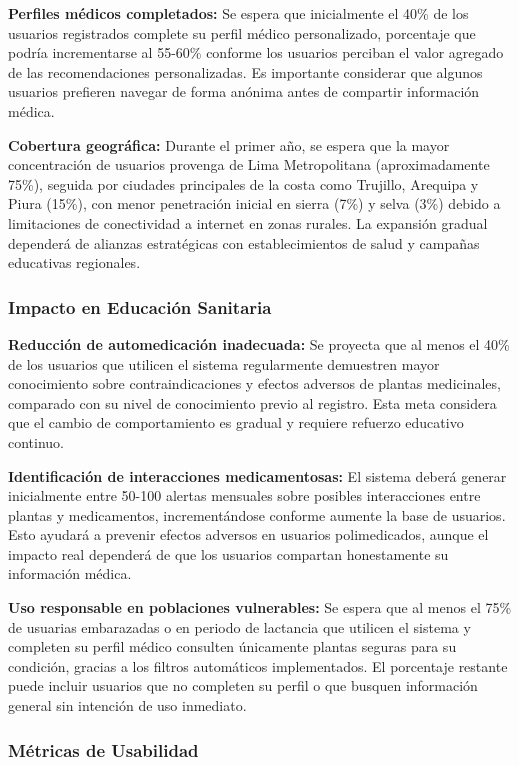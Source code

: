 \documentclass[12pt,a4paper]{article}
\begin{document}
\textbf{Perfiles médicos completados:} Se espera que inicialmente el 40\% de los usuarios registrados complete su perfil médico personalizado, porcentaje que podría incrementarse al 55-60\% conforme los usuarios perciban el valor agregado de las recomendaciones personalizadas. Es importante considerar que algunos usuarios prefieren navegar de forma anónima antes de compartir información médica.

\textbf{Cobertura geográfica:} Durante el primer año, se espera que la mayor concentración de usuarios provenga de Lima Metropolitana (aproximadamente 75\%), seguida por ciudades principales de la costa como Trujillo, Arequipa y Piura (15\%), con menor penetración inicial en sierra (7\%) y selva (3\%) debido a limitaciones de conectividad a internet en zonas rurales. La expansión gradual dependerá de alianzas estratégicas con establecimientos de salud y campañas educativas regionales.

\subsubsection{Impacto en Educación Sanitaria}

\textbf{Reducción de automedicación inadecuada:} Se proyecta que al menos el 40\% de los usuarios que utilicen el sistema regularmente demuestren mayor conocimiento sobre contraindicaciones y efectos adversos de plantas medicinales, comparado con su nivel de conocimiento previo al registro. Esta meta considera que el cambio de comportamiento es gradual y requiere refuerzo educativo continuo.

\textbf{Identificación de interacciones medicamentosas:} El sistema deberá generar inicialmente entre 50-100 alertas mensuales sobre posibles interacciones entre plantas y medicamentos, incrementándose conforme aumente la base de usuarios. Esto ayudará a prevenir efectos adversos en usuarios polimedicados, aunque el impacto real dependerá de que los usuarios compartan honestamente su información médica.

\textbf{Uso responsable en poblaciones vulnerables:} Se espera que al menos el 75\% de usuarias embarazadas o en periodo de lactancia que utilicen el sistema y completen su perfil médico consulten únicamente plantas seguras para su condición, gracias a los filtros automáticos implementados. El porcentaje restante puede incluir usuarios que no completen su perfil o que busquen información general sin intención de uso inmediato.

\subsubsection{Métricas de Usabilidad}
\end{document}
